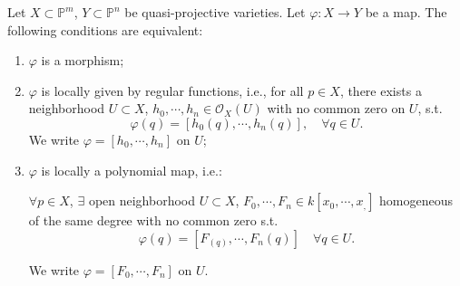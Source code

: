 \begin{theorem}\label{18}
	Let $ X\subset \mathbb{P}^m $, $ Y\subset \mathbb{P}^n $ be quasi-projective varieties. Let $ \varphi :X\to Y $ be a map. The following conditions are equivalent:
	\begin{enumerate}
		\item $ \varphi $ is a morphism;
		\item $ \varphi $ is locally given by regular functions, i.e., for all $ p\in X $, there exists a neighborhood $ U\subset X $, $ h_0,\cdots,h_n\in \mathcal{O}_X(U) $ with no common zero on $ U $, s.t.
		      $$
			      \varphi(q)=[h_0(q),\cdots,h_n(q)],\quad \forall q\in U.
		      $$
		      We write $ \varphi = [h_0,\cdots,h_n] $ on $ U $;
		\item $ \varphi $ is locally a polynomial map, i.e.:
		      \begin{center}
			      $ \forall p\in X $, $ \exists  $ open neighborhood $ U\subset X $, $ F_0,\cdots,F_n\in k[x_0,\cdots,x_,] $ homogeneous of the same degree with no common zero s.t.
			      $$
				      \varphi(q)=[F_(q),\cdots,F_n(q)] \quad \forall q\in U.
			      $$
		      \end{center}
		      We write $ \varphi = [F_0,\cdots,F_n] $ on $ U $.
	\end{enumerate}
\end{theorem}

